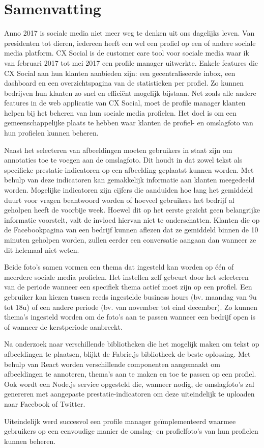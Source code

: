 \chapter{Samenvatting}
\vspace{-3cm}
Anno 2017 is sociale media niet meer weg te denken uit ons dagelijks leven. Van presidenten tot dieren, iedereen heeft een wel een profiel op een of andere sociale media platform. CX Social is de customer care tool voor sociale media waar ik van februari 2017 tot mei 2017 een profile manager uitwerkte. Enkele features die CX Social aan hun klanten aanbieden zijn: een gecentraliseerde inbox,  een dashboard en een overzichtspagina van de statistieken per profiel. Zo kunnen bedrijven hun klanten zo snel en effici\"{e}nt mogelijk bijstaan. Net zoals alle andere features in de web applicatie van CX Social, moet de profile manager klanten helpen bij het beheren van hun sociale media profielen. Het doel is om een gemeenschappelijke plaats te hebben waar klanten de profiel- en omslagfoto van hun profielen kunnen beheren.

Naast het selecteren van afbeeldingen moeten gebruikers in staat zijn om annotaties toe te voegen aan de omslagfoto. Dit houdt in dat zowel tekst als specifieke prestatie-indicatoren op een afbeelding geplaatst kunnen worden. Met behulp van deze indicatoren kan gemakkelijk informatie aan klanten meegedeeld worden. Mogelijke indicatoren zijn cijfers die aanduiden hoe lang het gemiddeld duurt voor vragen beantwoord worden of hoeveel gebruikers het bedrijf al geholpen heeft de voorbije week. Hoewel dit op het eerste gezicht geen belangrijke informatie voorstelt, valt de invloed hiervan niet te onderschatten. Klanten die op de Facebookpagina van een bedrijf kunnen aflezen dat ze gemiddeld binnen de 10 minuten geholpen worden, zullen eerder een conversatie aangaan dan wanneer ze dit helemaal niet weten.

Beide foto's samen vormen een thema dat ingesteld kan worden op \'{e}\'{e}n of meerdere sociale media profielen. Het instellen zelf gebeurt door het selecteren van de periode wanneer een specifiek thema actief moet zijn op een profiel. Een gebruiker kan kiezen tussen reeds ingestelde business hours (bv. maandag van 9u tot 18u) of een andere periode (bv. van november tot eind december). Zo kunnen thema's ingesteld worden om de foto's aan te passen wanneer een bedrijf open is of wanneer de kerstperiode aanbreekt. 

Na onderzoek naar verschillende bibliotheken die het mogelijk maken om tekst op afbeeldingen te plaatsen, blijkt de Fabric.js bibliotheek de beste oplossing. Met behulp van React worden verschillende componenten aangemaakt om afbeeldingen te annoteren, thema's aan te maken en toe te passen op een profiel. Ook wordt een Node.js service opgesteld die, wanneer nodig, de omslagfoto's zal genereren met aangepaste prestatie-indicatoren om deze uiteindelijk te uploaden naar Facebook of Twitter. 

Uiteindelijk werd succesvol een profile manager ge\"{i}mplementeerd waarmee gebruikers op een eenvoudige manier de omslag- en profielfoto's van hun profielen kunnen beheren. 

